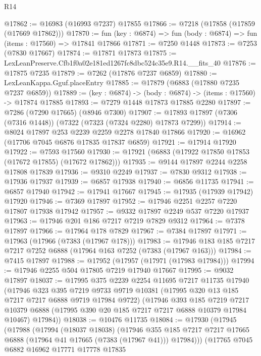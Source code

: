 \begin{lexlean}{R14}
\begin{coremodule}
@17862 := @16983 (@16993 @7237) @17855
@17866 := @7218 (@17858 (@17859 (@17669 @17862)))
@17870 := fun (key : @6874) => fun (body : @6874) => fun (items : @17560) => @17841 @17866
@17871 := @7250 @1448
@17873 := @7253 (@7830 @17667)
@17874 := @17871 @17873
@17875 := LexLeanPreserve.Cfb1f0a02e181ed1267fc8dbc524c35e9.R14.__fits_40
@17876 := @17875 @7235
@17879 := @7262 (@17876 @7237 @6859)
@17880 := LexLeanKappa.Gguf.placeEntry
@17885 := @17879 (@6883 (@17880 @7235 @7237 @6859))
@17889 := (key : @6874) -> (body : @6874) -> (items : @17560) -> @17874 @17885
@17893 := @7279 @1448 @17873 @17885 @2280
@17897 := @7286 (@7290 @17665) (@8946 @7300)
@17907 := @17893 @17897 (@7306 (@7316 @1448)) (@7322 (@7323 (@7324 @2280) @17873 @7299))
@17914 := @8024 @17897 @253 @2239 @2259 @2278 @17840 @17866
@17920 := @16962 (@17706 @7045 @6876 @17835 @17837 @6859)
@17921 := @17914 @17920
@17922 := @7593 @17560
@17930 := @17921 (@6883 (@17922 @17850 @17853 (@17672 @17855) (@17672 @17862)))
@17935 := @9144 @17897 @2244 @2258 @17808 @17839
@17936 := @9310 @2249
@17937 := @7830 @9312
@17938 := @17936 @17937
@17939 := @6857 @17938
@17940 := @6856 @11735
@17941 := @6857 @17940
@17942 := @17941 @17667
@17945 := @17935 (@17939 @17942) @17920
@17946 := @7369 @17897
@17952 := @17946 @2251 @2257 @7220 @17807 @17938 @17942
@17957 := @9332 @17897 @2249 @537 @7220 @17937
@17963 := @17946 @201 @186 @7217 @7219 @7829 @9312
@17964 := @7378 @17897
@17966 := @17964 @178 @7829
@17967 := @7384 @17897
@17971 := @17963 (@17966 (@7383 (@17967 @178)))
@17983 := @17946 @183 @185 @7217 @7217 @7252 @6888 (@17964 @163 @7252 (@7383 (@17967 @163)))
@17984 := @7415 @17897
@17988 := @17952 (@17957 (@17971 (@17983 @17984)))
@17994 := @17946 @2255 @504 @17805 @7219 @17940 @17667
@17995 := @9032 @17897
@18037 := @17995
    @375
    @2239
    @2254
    @11695
    @7217
    @11735
    @17940
    (@17946
      @323
      @395
      @7219
      @9733
      @9719
      @10381
      (@17995 @320 @13 @185 @7217 @7217 @6888 @9719 @17984 @9722)
      (@17946
        @393
        @185
        @7219
        @7217
        @10379
        @6888
        (@17995 @390 @20 @185 @7217 @7217 @6888 @10379 @17984 @10467)
        @17984))
@18038 := @10476 @11735
@18084 := @17930
    (@17945
      (@17988
        (@17994
          (@18037 @18038)
          (@17946
            @355
            @185
            @7217
            @7217
            @17665
            @6888
            (@17964 @41 @17665 (@7383 (@17967 @41)))
            @17984)))
      (@17765
        @7045
        @6882
        @16962
        @17771
        @17778
        @17835

\end{coremodule}
\end{lexlean}
